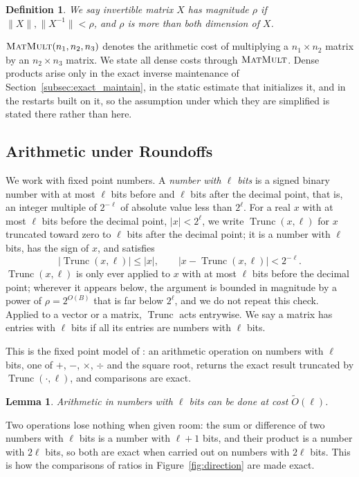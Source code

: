 \documentclass[11pt]{article}
\newtheorem{lemma}{Lemma}[section]
\newtheorem{definition}{Definition}[section]
\newcommand{\Trunc}{\operatorname{Trunc}}
\newcommand{\MM}{\textsc{MatMult}}
\renewcommand{\O}{\widetilde O}
\begin{document}
\begin{definition}
We say invertible matrix $X$ has magnitude
$\rho$ if
$\|X\|, \|X^{-1}\| < \rho$, and
$\rho$ is more than both dimension of
$X$.
\end{definition}

$\MM(n_1, n_2, n_3)$ denotes the arithmetic cost of multiplying a
$n_1 \times n_2$ matrix by an
$n_2 \times n_3$ matrix.
We state all dense costs through $\MM$.
Dense products arise only in the exact inverse maintenance of
Section~\ref{subsec:exact_maintain}, in the static estimate that initializes it,
and in the restarts built on it, so the assumption under which they are
simplified is stated there rather than here.

\subsection{Arithmetic under Roundoffs}
\label{subsec:roundoff}

We work with fixed point numbers.
A \emph{number with $\ell$ bits} is a signed binary number with at most
$\ell$ bits before and
$\ell$ bits after the decimal point, that is, an integer multiple of
$2^{-\ell}$ of absolute value less than
$2^{\ell}$.
For a real $x$ with at most
$\ell$ bits before the decimal point,
$|x| < 2^{\ell}$, we write
$\Trunc(x, \ell)$ for
$x$ truncated toward zero to
$\ell$ bits after the decimal point; it is a number with
$\ell$ bits, has the sign of
$x$, and satisfies
\[
|\Trunc(x, \ell)| \le |x|,
\qquad
|x - \Trunc(x, \ell)| < 2^{-\ell} .
\]
$\Trunc(x, \ell)$ is only ever applied to
$x$ with at most
$\ell$ bits before the decimal point; wherever it appears below, the argument is
bounded in magnitude by a power of $\rho = 2^{O(B)}$ that is far below
$2^{\ell}$, and we do not repeat this check.
Applied to a vector or a matrix, $\Trunc$ acts entrywise.
We say a matrix has entries with $\ell$ bits if all its entries are numbers with
$\ell$ bits.

This is the fixed point model of \cite{GPV23}: an
arithmetic operation on numbers with $\ell$ bits, one of
$+$,
$-$,
$\times$,
$\div$ and the square root, returns the exact result truncated by
$\Trunc(\cdot, \ell)$, and comparisons are exact.

\begin{lemma}
\label{lem:arith}
Arithmetic in numbers with $\ell$ bits can be done at cost
$\O(\ell)$.
\end{lemma}

Two operations lose nothing when given room: the sum or difference of two
numbers with $\ell$ bits is a number with
$\ell + 1$ bits, and their product is a number with
$2 \ell$ bits, so both are exact when carried out on numbers with
$2 \ell$ bits.
This is how the comparisons of ratios in Figure~\ref{fig:direction} are made
exact.
\end{document}
